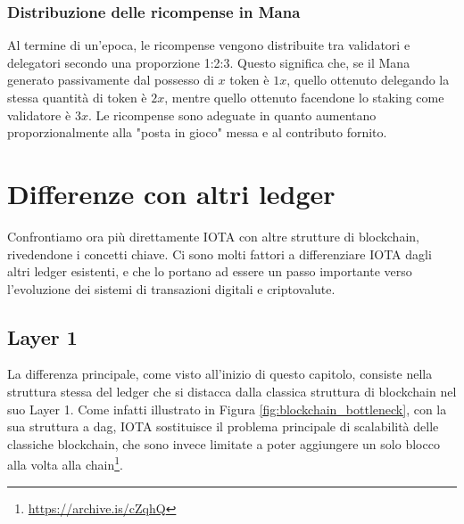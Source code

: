 \documentclass[12pt,a4paper,openright,twoside]{report}
\begin{document}
\subsubsection{Distribuzione delle ricompense in Mana}
Al termine di un'epoca, le ricompense vengono distribuite tra validatori e delegatori secondo una proporzione 1:2:3. Questo significa che, se il Mana generato passivamente dal possesso di \(x\) token è \(1x\), quello ottenuto delegando la stessa quantità di token è \(2x\), mentre quello ottenuto facendone lo staking come validatore è \(3x\). Le ricompense sono adeguate in quanto aumentano proporzionalmente alla "posta in gioco" messa e al contributo fornito.

\section{Differenze con altri ledger}
Confrontiamo ora più direttamente IOTA con altre strutture di blockchain, rivedendone i concetti chiave. Ci sono molti fattori a differenziare IOTA dagli altri ledger esistenti, e che lo portano ad essere un passo importante verso l'evoluzione dei sistemi di transazioni digitali e criptovalute.
\subsection{Layer 1}
La differenza principale, come visto all'inizio di questo capitolo, consiste nella struttura stessa del ledger che si distacca dalla classica struttura di blockchain nel suo Layer 1. Come infatti illustrato in Figura \ref{fig:blockchain_bottleneck}, con la sua struttura a \acrshort{dag}, IOTA sostituisce il problema principale di scalabilità delle classiche blockchain, che sono invece limitate a poter aggiungere un solo blocco alla volta alla chain\footnote{\url{https://archive.is/cZqhQ}}. 
\end{document}

